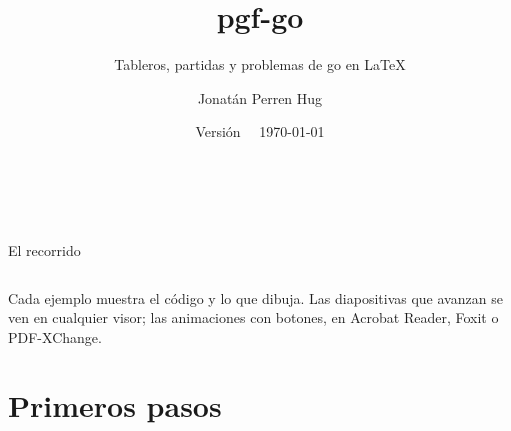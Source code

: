 \documentclass[aspectratio = 169, 10pt]{beamer}
\title{pgf-go}
\subtitle{Tableros, partidas y problemas de go en LaTeX}
\author{Jonatán Perren Hug}
\date{Versión \version\ \textperiodcentered\ \today}
\begin{document}

\begin{frame}[plain]
	\begin{columns}[c]
			{\color{nogal}\inserttitle\par}
			\medskip
			{\large\insertsubtitle\par}
			\bigskip
			{\color{madera}\rule{0.8\linewidth}{1.5pt}}\par
			\medskip
			\insertauthor\par
			\smallskip
			{\small\color{nogal}\insertdate\par}
			\centering
			\begin{goban}[sgf size = lee, profile = shell, scale = 0.52, captures]
			\end{goban}
	\end{columns}
\end{frame}

\begin{frame}{El recorrido}
	\begin{columns}[t]
			\tableofcontents[sections = {1-6}]
			\tableofcontents[sections = {7-12}]
	\end{columns}
	\vfill
	\small\color{nogal!80}
	Cada ejemplo muestra el código y lo que dibuja. Las diapositivas que avanzan se ven en cualquier
	visor; las animaciones con botones, en Acrobat Reader, Foxit o PDF-XChange.
\end{frame}



\section{Primeros pasos}
\end{document}
